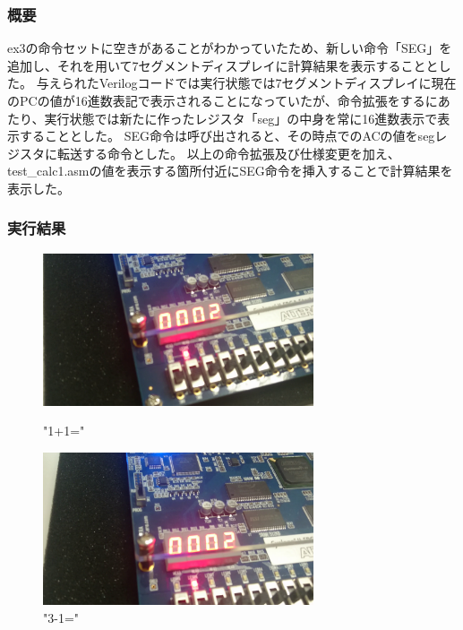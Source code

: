 \documentclass{jsarticle}
\begin{document}
\subsubsection*{概要}
ex3の命令セットに空きがあることがわかっていたため、新しい命令「SEG」を追加し、それを用いて7セグメントディスプレイに計算結果を表示することとした。
与えられたVerilogコードでは実行状態では7セグメントディスプレイに現在のPCの値が16進数表記で表示されることになっていたが、命令拡張をするにあたり、実行状態では新たに作ったレジスタ「seg」の中身を常に16進数表示で表示することとした。
SEG命令は呼び出されると、その時点でのACの値をsegレジスタに転送する命令とした。
以上の命令拡張及び仕様変更を加え、test\_calc1.asmの値を表示する箇所付近にSEG命令を挿入することで計算結果を表示した。

\subsubsection*{実行結果}

\begin{figure}[htbp]
 \begin{minipage}{0.5\hsize}
  \begin{center}
  \includegraphics[width=8cm,bb=0 0 1920 1080]{1+1.png}
  \end{center}
  \caption{"1+1="}
 \end{minipage}
 \begin{minipage}{0.5\hsize}
  \begin{center}
   \includegraphics[width=8cm,bb=0 0 1920 1080]{3-1.png}
  \end{center}
  \caption{"3-1="}
 \end{minipage}
\end{figure}
\end{document}
